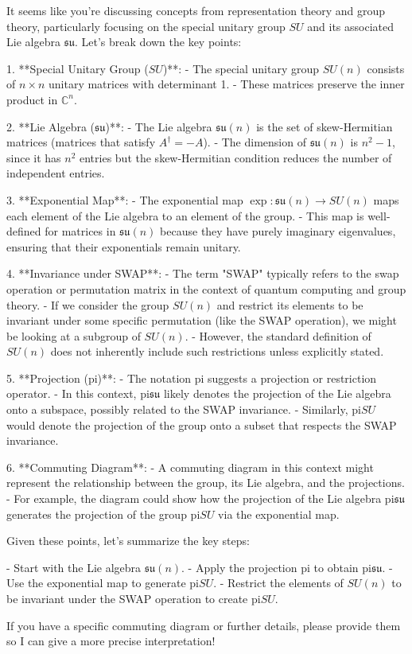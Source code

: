It seems like you're discussing concepts from representation theory and group theory, particularly focusing on the special unitary group \( SU \) and its associated Lie algebra \( \mathfrak{su} \). Let's break down the key points:

1. **Special Unitary Group (\( SU \))**:
   - The special unitary group \( SU(n) \) consists of \( n \times n \) unitary matrices with determinant 1.
   - These matrices preserve the inner product in \( \mathbb{C}^n \).

2. **Lie Algebra (\( \mathfrak{su} \))**:
   - The Lie algebra \( \mathfrak{su}(n) \) is the set of skew-Hermitian matrices (matrices that satisfy \( A^\dagger = -A \)).
   - The dimension of \( \mathfrak{su}(n) \) is \( n^2 - 1 \), since it has \( n^2 \) entries but the skew-Hermitian condition reduces the number of independent entries.

3. **Exponential Map**:
   - The exponential map \( \exp: \mathfrak{su}(n) \to SU(n) \) maps each element of the Lie algebra to an element of the group.
   - This map is well-defined for matrices in \( \mathfrak{su}(n) \) because they have purely imaginary eigenvalues, ensuring that their exponentials remain unitary.

4. **Invariance under SWAP**:
   - The term "SWAP" typically refers to the swap operation or permutation matrix in the context of quantum computing and group theory.
   - If we consider the group \( SU(n) \) and restrict its elements to be invariant under some specific permutation (like the SWAP operation), we might be looking at a subgroup of \( SU(n) \).
   - However, the standard definition of \( SU(n) \) does not inherently include such restrictions unless explicitly stated.

5. **Projection (\( \text{pi} \))**:
   - The notation \( \text{pi} \) suggests a projection or restriction operator.
   - In this context, \( \text{pi} \mathfrak{su} \) likely denotes the projection of the Lie algebra onto a subspace, possibly related to the SWAP invariance.
   - Similarly, \( \text{pi} SU \) would denote the projection of the group onto a subset that respects the SWAP invariance.

6. **Commuting Diagram**:
   - A commuting diagram in this context might represent the relationship between the group, its Lie algebra, and the projections.
   - For example, the diagram could show how the projection of the Lie algebra \( \text{pi} \mathfrak{su} \) generates the projection of the group \( \text{pi} SU \) via the exponential map.

Given these points, let's summarize the key steps:

- Start with the Lie algebra \( \mathfrak{su}(n) \).
- Apply the projection \( \text{pi} \) to obtain \( \text{pi} \mathfrak{su} \).
- Use the exponential map to generate \( \text{pi} SU \).
- Restrict the elements of \( SU(n) \) to be invariant under the SWAP operation to create \( \text{pi} SU \).

If you have a specific commuting diagram or further details, please provide them so I can give a more precise interpretation!